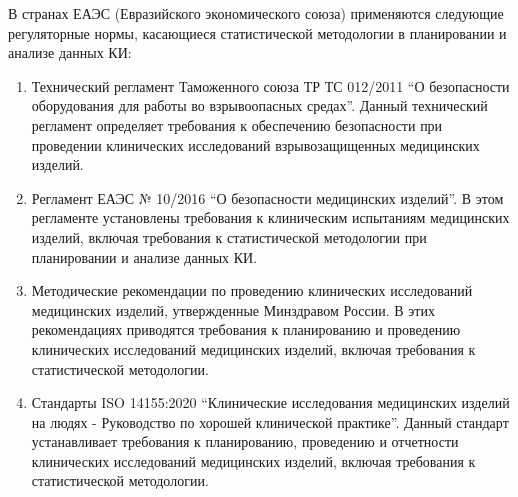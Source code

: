 \documentclass[
]{article}
\begin{document}
В странах ЕАЭС (Евразийского экономического союза) применяются следующие
регуляторные нормы, касающиеся статистической методологии в планировании
и анализе данных КИ:

\begin{enumerate}
\def\labelenumi{\arabic{enumi}.}
\item
  Технический регламент Таможенного союза ТР ТС 012/2011 ``О
  безопасности оборудования для работы во взрывоопасных средах''. Данный
  технический регламент определяет требования к обеспечению безопасности
  при проведении клинических исследований взрывозащищенных медицинских
  изделий.
\item
  Регламент ЕАЭС № 10/2016 ``О безопасности медицинских изделий''. В
  этом регламенте установлены требования к клиническим испытаниям
  медицинских изделий, включая требования к статистической методологии
  при планировании и анализе данных КИ.
\item
  Методические рекомендации по проведению клинических исследований
  медицинских изделий, утвержденные Минздравом России. В этих
  рекомендациях приводятся требования к планированию и проведению
  клинических исследований медицинских изделий, включая требования к
  статистической методологии.
\item
  Стандарты ISO 14155:2020 ``Клинические исследования медицинских
  изделий на людях - Руководство по хорошей клинической практике''.
  Данный стандарт устанавливает требования к планированию, проведению и
  отчетности клинических исследований медицинских изделий, включая
  требования к статистической методологии.
\end{enumerate}
\end{document}
